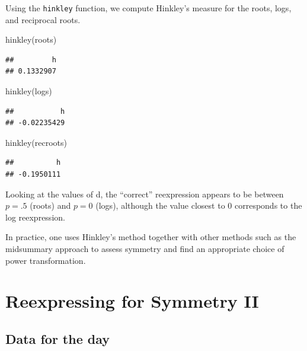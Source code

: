 \documentclass[
]{book}
\newenvironment{Shaded}{\begin{snugshade}}{\end{snugshade}}
\newcommand{\FunctionTok}[1]{\textcolor[rgb]{0.00,0.00,0.00}{#1}}
\newcommand{\NormalTok}[1]{#1}
\begin{document}
Using the \texttt{hinkley} function, we compute Hinkley's measure for the roots, logs, and reciprocal roots.

\begin{Shaded}
\begin{Highlighting}[]
\FunctionTok{hinkley}\NormalTok{(roots)}
\end{Highlighting}
\end{Shaded}

\begin{verbatim}
##         h 
## 0.1332907
\end{verbatim}

\begin{Shaded}
\begin{Highlighting}[]
\FunctionTok{hinkley}\NormalTok{(logs)}
\end{Highlighting}
\end{Shaded}

\begin{verbatim}
##           h 
## -0.02235429
\end{verbatim}

\begin{Shaded}
\begin{Highlighting}[]
\FunctionTok{hinkley}\NormalTok{(recroots)}
\end{Highlighting}
\end{Shaded}

\begin{verbatim}
##          h 
## -0.1950111
\end{verbatim}

Looking at the values of d, the ``correct'' reexpression appears to be between \(p = .5\) (roots) and \(p = 0\) (logs), although the value closest to 0 corresponds to the log reexpression.

In practice, one uses Hinkley's method together with other methods such as the midsummary approach to assess symmetry and find an appropriate choice of power transformation.

\hypertarget{reexpressing-for-symmetry-ii}{%
\chapter{Reexpressing for Symmetry II}\label{reexpressing-for-symmetry-ii}}

\hypertarget{data-for-the-day-1}{%
\section{Data for the day}\label{data-for-the-day-1}}
\end{document}
